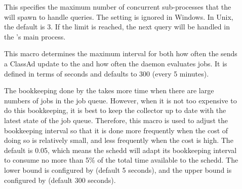 \begin{description}
\item[] \label{param:ScheddQueryWorkers}
  This specifies the maximum number of concurrent sub-processes that
  the  will spawn to handle queries.  The setting is
  ignored in Windows.  In Unix, the default is 3.  If the limit is
  reached, the next query will be handled in the 's main
  process.

\item[] \label{param:ScheddInterval} This
  macro determines the maximum interval for both how often the
   sends a ClassAd update to the  and
  how often the  daemon evaluates jobs.  It is defined
  in terms of seconds and defaults to 300 (every 5 minutes).

\item[]
\label{param:ScheddIntervalTimeslice} The bookkeeping done by the
 takes more time when there are large numbers of jobs
in the job queue.  However, when it is not too expensive to do this
bookkeeping, it is best to keep the collector up to date with the
latest state of the job queue.  Therefore, this macro is used to
adjust the bookkeeping interval so that it is done more frequently
when the cost of doing so is relatively small, and less frequently
when the cost is high.  The default is 0.05, which means the schedd
will adapt its bookkeeping interval to consume no more than 5\% of the
total time available to the schedd.  The lower bound is configured by
 (default 5 seconds), and the upper bound
is configured by  (default 300 seconds).




  

\end{description}
